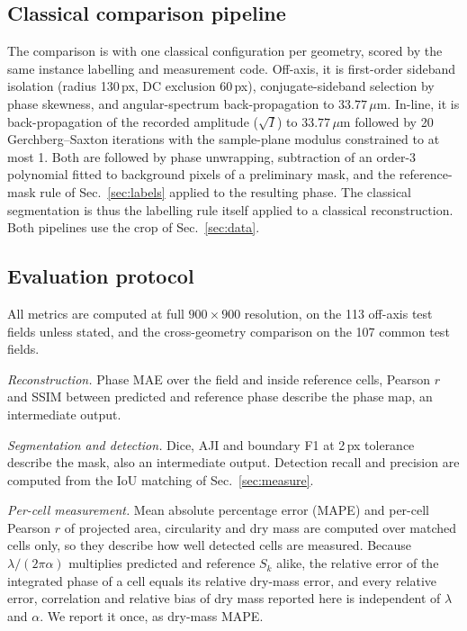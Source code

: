 \documentclass[11pt]{article}
\begin{document}
\subsection{Classical comparison pipeline}
\label{sec:classical}

The comparison is with one classical configuration per geometry, scored by the
same instance labelling and measurement code. Off-axis, it is first-order
sideband isolation (radius 130\,px, DC exclusion 60\,px), conjugate-sideband
selection by phase skewness, and angular-spectrum back-propagation to
$33.77\,\mu$m. In-line, it is back-propagation of the recorded amplitude
($\sqrt{I}$) to $33.77\,\mu$m followed by 20 Gerchberg--Saxton iterations with
the sample-plane modulus constrained to at most 1. Both are followed by phase
unwrapping, subtraction of an order-3 polynomial fitted to background pixels of
a preliminary mask, and the reference-mask rule of Sec.~\ref{sec:labels}
applied to the resulting phase. The classical segmentation is thus the
labelling rule itself applied to a classical reconstruction. Both pipelines use
the crop of Sec.~\ref{sec:data}.

\subsection{Evaluation protocol}
\label{sec:eval}

All metrics are computed at full $900\times900$ resolution, on the 113
off-axis test fields unless stated, and the cross-geometry comparison on the
107 common test fields.

\emph{Reconstruction.} Phase MAE over the field and inside reference cells,
Pearson $r$ and SSIM between predicted and reference phase describe the phase
map, an intermediate output.

\emph{Segmentation and detection.} Dice, AJI and boundary F1 at 2\,px
tolerance describe the mask, also an intermediate output. Detection recall and
precision are computed from the IoU matching of Sec.~\ref{sec:measure}.

\emph{Per-cell measurement.} Mean absolute percentage error (MAPE) and per-cell
Pearson $r$ of projected area, circularity and dry mass are computed over
matched cells only, so they describe how well detected cells are measured.
Because $\lambda/(2\pi\alpha)$ multiplies predicted and reference $S_k$ alike,
the relative error of the integrated phase of a cell equals its relative
dry-mass error, and every relative error, correlation and relative bias of dry
mass reported here is independent of $\lambda$ and $\alpha$. We report it once,
as dry-mass MAPE.
\end{document}
